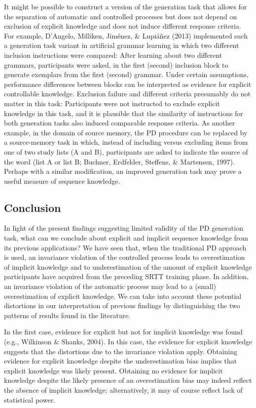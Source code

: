 \documentclass[floatsintext,man]{apa6}
\begin{document}
It might be possible to construct a version of the generation task that
allows for the separation of automatic and controlled processes but does
not depend on exclusion of explicit knowledge and does not induce
different response criteria. For example, D'Angelo, Milliken, Jiménez,
\& Lupiáñez (2013) implemented such a generation task variant in
artificial grammar learning in which two different inclusion
instructions were compared: After learning about two different grammars,
participants were asked, in the first (second) inclusion block to
generate exemplars from the first (second) grammar. Under certain
assumptions, performance differences between blocks can be interpreted
as evidence for explicit controllable knowledge. Exclusion failure and
different criteria presumably do not matter in this task: Participants
were not instructed to exclude explicit knowledge in this task, and it
is plausible that the similarity of instructions for both generation
tasks also induced comparable response criteria. As another example, in
the domain of source memory, the PD procedure can be replaced by a
source-memory task in which, instead of including versus excluding items
from one of two study lists (A and B), participants are asked to
indicate the source of the word (list A or list B; Buchner, Erdfelder,
Steffens, \& Martensen, 1997). Perhaps with a similar modification, an
improved generation task may prove a useful measure of sequence
knowledge.

\subsection{Conclusion}\label{conclusion}

In light of the present findings suggesting limited validity of the PD
generation task, what can we conclude about explicit and implicit
sequence knowledge from its previous applications? We have seen that,
when the traditional PD approach is used, an invariance violation of the
controlled process leads to overestimation of implicit knowledge and to
underestimation of the amount of explicit knowledge participants have
acquired from the preceding SRTT training phase. In addition, an
invariance violation of the automatic process may lead to a (small)
overestimation of explicit knowledge. We can take into account these
potential distortions in our interpretation of previous findings by
distinguishing the two patterns of results found in the literature.

In the first case, evidence for explicit but not for implicit knowledge
was found (e.g., Wilkinson \& Shanks, 2004). In this case, the evidence
for explicit knowledge suggests that the distortions due to the
invariance violation apply. Obtaining evidence for explicit knowledge
despite the underestimation bias implies that explicit knowledge was
likely present. Obtaining no evidence for implicit knowledge despite the
likely presence of an overestimation bias may indeed reflect the absence
of implicit knowledge; alternatively, it may of course reflect lack of
statistical power.
\end{document}
